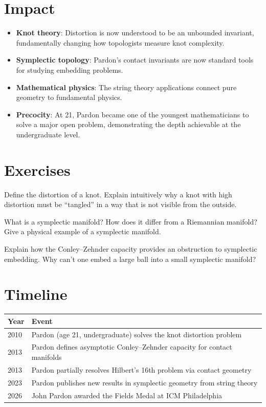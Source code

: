 \section{Impact}
\begin{itemize}
\item \textbf{Knot theory}: Distortion is now understood to be an unbounded invariant, fundamentally changing how topologists measure knot complexity.
\item \textbf{Symplectic topology}: Pardon's contact invariants are now standard tools for studying embedding problems.
\item \textbf{Mathematical physics}: The string theory applications connect pure geometry to fundamental physics.
\item \textbf{Precocity}: At 21, Pardon became one of the youngest mathematicians to solve a major open problem, demonstrating the depth achievable at the undergraduate level.
\end{itemize}

\section{Exercises}

\begin{exercise}[Basic]
Define the distortion of a knot. Explain intuitively why a knot with high distortion must be ``tangled'' in a way that is not visible from the outside.
\end{exercise}

\begin{exercise}[Intermediate]
What is a symplectic manifold? How does it differ from a Riemannian manifold? Give a physical example of a symplectic manifold.
\end{exercise}

\begin{exercise}[Challenge]
Explain how the Conley--Zehnder capacity provides an obstruction to symplectic embedding. Why can't one embed a large ball into a small symplectic manifold?
\end{exercise}

\section{Timeline}

\begin{tabularx}{\linewidth}{lX}
\toprule
\textbf{Year} & \textbf{Event} \\ \midrule
2010 & Pardon (age 21, undergraduate) solves the knot distortion problem \\
2013 & Pardon defines asymptotic Conley--Zehnder capacity for contact manifolds \\
2013 & Pardon partially resolves Hilbert's 16th problem via contact geometry \\
2023 & Pardon publishes new results in symplectic geometry from string theory \\
2026 & John Pardon awarded the Fields Medal at ICM Philadelphia \\
\bottomrule
\end{tabularx}

